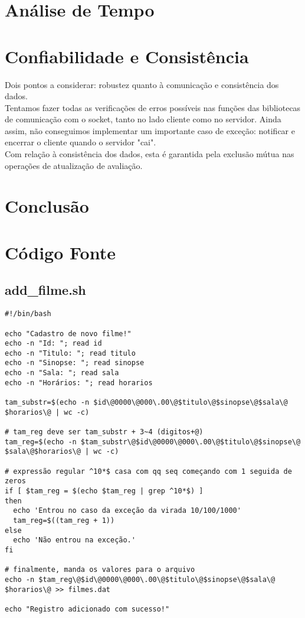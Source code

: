 \documentclass[11pt,twoside]{article}
\begin{document}
\section{Análise de Tempo}

\section{Confiabilidade e Consistência}
Dois pontos a considerar: robustez quanto à comunicação e consistência dos dados.\\
Tentamos fazer todas as verificações de erros possíveis nas funções das bibliotecas de comunicação com o socket, tanto no lado cliente como no servidor. Ainda assim, não conseguimos implementar um importante caso de exceção: notificar e encerrar o cliente quando o servidor "cai".\\
Com relação à consistência dos dados, esta é garantida pela exclusão mútua nas operações de atualização de avaliação.

\section{Conclusão}


\section{Código Fonte}

\subsection{add\_filme.sh}  %
\begin{verbatim}
#!/bin/bash

echo "Cadastro de novo filme!"
echo -n "Id: "; read id
echo -n "Titulo: "; read titulo
echo -n "Sinopse: "; read sinopse
echo -n "Sala: "; read sala
echo -n "Horários: "; read horarios

tam_substr=$(echo -n $id\@0000\@000\.00\@$titulo\@$sinopse\@$sala\@
$horarios\@ | wc -c)

# tam_reg deve ser tam_substr + 3~4 (digitos+@)
tam_reg=$(echo -n $tam_substr\@$id\@0000\@000\.00\@$titulo\@$sinopse\@
$sala\@$horarios\@ | wc -c)

# expressão regular ^10*$ casa com qq seq começando com 1 seguida de zeros
if [ $tam_reg = $(echo $tam_reg | grep ^10*$) ]
then
  echo 'Entrou no caso da exceção da virada 10/100/1000'
  tam_reg=$((tam_reg + 1))
else
  echo 'Não entrou na exceção.'
fi

# finalmente, manda os valores para o arquivo
echo -n $tam_reg\@$id\@0000\@000\.00\@$titulo\@$sinopse\@$sala\@
$horarios\@ >> filmes.dat

echo "Registro adicionado com sucesso!"
\end{verbatim}
\end{document}
